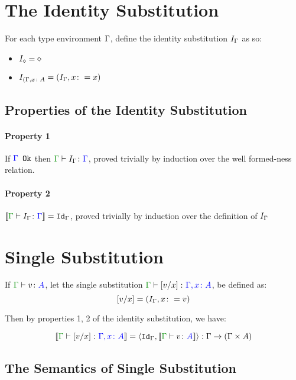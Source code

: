 \documentclass{report}
\begin{document}
\section{The Identity Substitution}
For each type environment $\G$, define the identity substitution $I_{\G}$ as so:

\begin{itemize}
    \item $I_{\nil} = \nil$
    \item $I_{(\gax} = (I_{\G}, x\setto x)$
\end{itemize}

\subsection{Properties of the Identity Substitution}
\paragraph{Property 1}
If $\ok{\G}$ then $\typerelation{\G}{I_{\G}}{\G}$, proved trivially by induction over the well formed-ness relation.

\paragraph{Property 2}
$\deno{\typerelation{\G}{I_{\G}}{\G}} = \idg$, proved trivially by induction over the definition of $I_{\G}$
\section{Single Substitution}

If $\typerelation{\G}{v}{A}$, let the single substitution $\typerelation{\G}{\ssub{x}{v}}{\gax}$, be defined as:
\begin{equation}
    \ssub{x}{v} = (I_{\G}, x\setto v)
\end{equation}

Then by properties 1, 2 of the identity substitution, we have:

\begin{equation}
    \deno{\gtyperelation{\ssub{x}{v}}{\gax}} = \pr{\idg}{\deno{\gtyperelation{v}{A}}}: \G\rightarrow(\G\times A)
\end{equation}
\subsection{The Semantics of Single Substitution}
\end{document}
